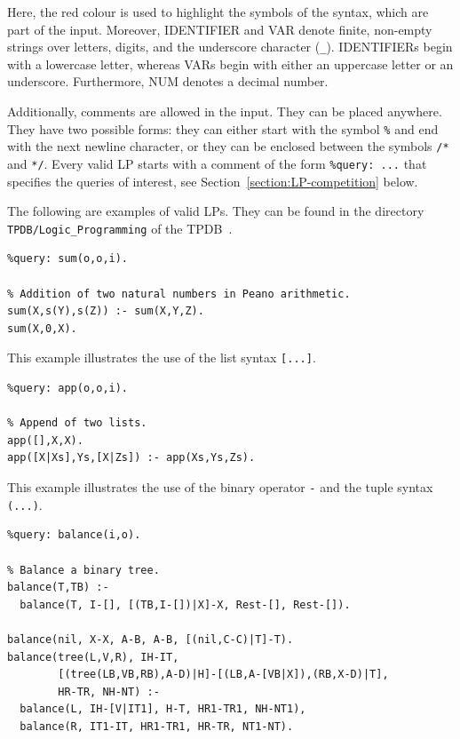 Here, the red colour is used to highlight the symbols of the syntax,
which are part of the input.
Moreover, IDENTIFIER and VAR denote finite, non-empty strings over
letters, digits, and the underscore character (\verb+_+).
IDENTIFIERs begin with a lowercase letter, whereas VARs begin
with either an uppercase letter or an underscore. Furthermore,
NUM denotes a decimal number.

Additionally, comments are allowed in the input. They can be placed anywhere.
They have two possible forms: they can either start with the symbol \verb+%+
and end with the next newline character, or they can be enclosed between the
symbols \verb+/*+ and \verb+*/+. Every valid LP starts with a comment
of the form \verb+%query: ...+ that specifies the queries of interest, see
Section~\ref{section:LP-competition} below.

The following are examples of valid LPs. They can be found in the
directory \texttt{TPDB/Logic\_Programming} of the TPDB~\cite{tpdb}.

\begin{example}\label{ex:lp-sum:syntax}
  \phantom{x}
  \begin{verbatim}
%query: sum(o,o,i).

% Addition of two natural numbers in Peano arithmetic.
sum(X,s(Y),s(Z)) :- sum(X,Y,Z).
sum(X,0,X).
  \end{verbatim}
\end{example}

\begin{example}\label{ex:lp-append:syntax}
  This example illustrates the use of the list syntax \verb+[...]+.
  \begin{verbatim}
%query: app(o,o,i).

% Append of two lists.
app([],X,X).
app([X|Xs],Ys,[X|Zs]) :- app(Xs,Ys,Zs).
  \end{verbatim}
\end{example}

\begin{example}\label{ex:lp-balance:syntax}
  This example illustrates the use of the binary operator \verb+-+
  and the tuple syntax \verb+(...)+.
  \begin{verbatim}
%query: balance(i,o).

% Balance a binary tree.
balance(T,TB) :-
  balance(T, I-[], [(TB,I-[])|X]-X, Rest-[], Rest-[]).

balance(nil, X-X, A-B, A-B, [(nil,C-C)|T]-T).
balance(tree(L,V,R), IH-IT,
        [(tree(LB,VB,RB),A-D)|H]-[(LB,A-[VB|X]),(RB,X-D)|T],
        HR-TR, NH-NT) :-
  balance(L, IH-[V|IT1], H-T, HR1-TR1, NH-NT1),
  balance(R, IT1-IT, HR1-TR1, HR-TR, NT1-NT).
  \end{verbatim}
\end{example}

